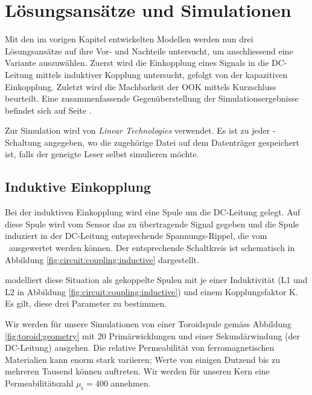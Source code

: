 \chapter{L\"osungsans\"atze und Simulationen}
\label{chap:simu}


Mit   den  im   vorigen  Kapitel   entwickelten  Modellen   werden  nun   drei
L\"osungsans\"atze auf  ihre Vor-  und Nachteile untersucht,  um anschliessend
eine Variante auszuw\"ahlen. Zuerst wird die  Einkopplung eines Signals in die
DC-Leitung mittels induktiver Kopplung untersucht, gefolgt von der kapazitiven
Einkopplung.   Zuletzt  wird  die  Machbarkeit  der  OOK  mittels  Kurzschluss
beurteilt. Eine zusammenfassende Gegen\"uberstellung der Simulationsergebnisse
befindet sich auf Seite \pageref{subsec:simu:conclusion}.

Zur  Simulation wird    \cite{ref:ltspice} von  \emph{Linear
Technologies} verwendet. Es  ist zu jeder  -Schaltung angegeben,
wo die  zugeh\"orige Datei  auf dem Datentr\"ager  gespeichert ist,  falls der
geneigte Leser selbst simulieren m\"ochte.


\section{Induktive Einkopplung}
\label{sec:simu:coupling:inductive}

Bei der induktiven Einkopplung wird eine  Spule um die DC-Leitung gelegt.  Auf
diese  Spule  wird  vom  Sensor  das  zu  \"ubertragende  Signal  gegeben  und
die  Spule induziert  in  der DC-Leitung  entsprechende Spannungs-Rippel,  die
vom  \Master~ausgewertet werden  k\"onnen. Der  entsprechende Schaltkreis  ist
schematisch in Abbildung \ref{fig:circuit:coupling:inductive} dargestellt.

 modelliert diese  Situation als gekoppelte Spulen  mit je einer
Induktivit\"at (L1  und L2 in  Abbildung \ref{fig:circuit:coupling:inductive})
und einem Kopplungsfaktor K. Es gilt, diese drei Parameter zu bestimmen.

Wir  werden   f\"ur  unsere   Simulationen  von  einer   Toroidspule  gem\"ass
Abbildung  \ref{fig:toroid:geometry}  mit   20  Prim\"arwicklungen  und  einer
Sekund\"arwindung (der DC-Leitung) ausgehen.  Die relative Permeabilit\"at von
ferromagnetischen Materialien  kann enorm  stark variieren; Werte  von einigen
Dutzend bis zu  mehreren Tausend k\"onnen auftreten. Wir  werden f\"ur unseren
Kern eine Permeabilit\"atszahl $\mu_{\mathrm{r}} = 400$ annehmen.


